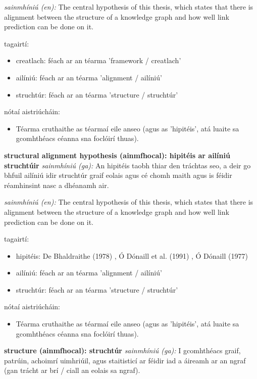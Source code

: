 \documentclass{article}
\begin{document}
\textit{sainmhíniú (en):} The central hypothesis of this thesis, which states that there is alignment between the structure of a knowledge graph and how well link prediction can be done on it.

tagairtí:
\begin{itemize}
	\item creatlach: féach ar an téarma 'framework / creatlach'
	\item ailíniú: féach ar an téarma 'alignment / ailíniú'
	\item struchtúr: féach ar an téarma 'structure / struchtúr'
\end{itemize}

nótaí aistriúcháin:
\begin{itemize}
	\item Téarma cruthaithe as téarmaí eile anseo (agus as 'hipitéis', atá luaite sa gcomhthéacs céanna sna foclóirí thuas).
\end{itemize}


\textbf{structural alignment hypothesis (ainmfhocal): hipitéis ar ailíniú struchtúir}
\textit{sainmhíniú (ga):} An hipitéis taobh thiar den tráchtas seo, a deir go bhfuil ailíniú idir struchtúr graif eolais agus cé chomh maith agus is féidir réamhinsint nasc a dhéanamh air.

\textit{sainmhíniú (en):} The central hypothesis of this thesis, which states that there is alignment between the structure of a knowledge graph and how well link prediction can be done on it.

tagairtí:
\begin{itemize}
	\item hipitéis: De Bhaldraithe (1978) \cite{de-bhaldraithe}, Ó Dónaill et al. (1991) \cite{focloir-beag}, Ó Dónaill (1977) \cite{odonaill}
	\item ailíniú: féach ar an téarma 'alignment / ailíniú'
	\item struchtúr: féach ar an téarma 'structure / struchtúr'
\end{itemize}

nótaí aistriúcháin:
\begin{itemize}
	\item Téarma cruthaithe as téarmaí eile anseo (agus as 'hipitéis', atá luaite sa gcomhthéacs céanna sna foclóirí thuas).
\end{itemize}


\textbf{structure (ainmfhocal): struchtúr}
\textit{sainmhíniú (ga):} I gcomhthéacs graif, patrúin, achoimrí uimhriúil, agus staitisticí ar féidir iad a áireamh ar an ngraf (gan trácht ar brí / ciall an eolais sa ngraf).
\end{document}

